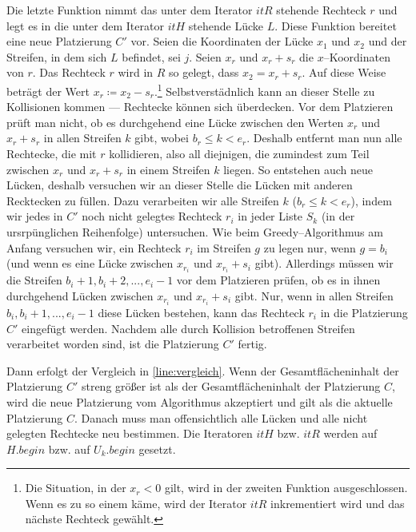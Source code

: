 Die letzte Funktion nimmt das unter dem Iterator $itR$ stehende Rechteck $r$
und legt es in die unter dem Iterator $itH$ stehende Lücke $L$.
Diese Funktion bereitet eine neue Platzierung $C'$ vor.
Seien die Koordinaten der Lücke $x_1$ und $x_2$ und der Streifen, in dem sich $L$ befindet, sei $j$. 
Seien $x_r$ und $x_r + s_r$ die $x$--Koordinaten von $r$.
Das Rechteck $r$ wird in $R$ so gelegt, dass $x_2 = x_r + s_r$. Auf diese Weise beträgt
der Wert $x_r \coloneqq x_2 - s_r$.\footnote{Die Situation, in der $x_r < 0$ gilt, wird  in der
zweiten Funktion ausgeschlossen. Wenn es zu so einem käme, wird der Iterator $itR$ inkrementiert wird und das nächste Rechteck gewählt.}
Selbstverstädnlich kann an dieser Stelle zu Kollisionen kommen --- Rechtecke können sich überdecken.
Vor dem Platzieren prüft man nicht, ob es durchgehend eine Lücke zwischen den Werten $x_r$ und $x_r + s_r$ 
in allen Streifen $k$ gibt, wobei $b_r \leqslant k < e_r$.
Deshalb entfernt man nun alle Rechtecke, die mit $r$ kollidieren, also all diejnigen, die 
zumindest zum Teil zwischen $x_r$ und $x_r + s_r$ in einem Streifen $k$ liegen.
So entstehen auch neue Lücken, deshalb versuchen wir an dieser Stelle 
die Lücken mit anderen Recktecken zu füllen.
Dazu verarbeiten wir alle Streifen $k$ ($b_r \leqslant k < e_r$), indem wir
jedes in $C'$ noch nicht gelegtes Rechteck $r_i$
in jeder Liste $S_k$ (in der ursrpünglichen Reihenfolge) untersuchen.
Wie beim Greedy--Algorithmus am Anfang versuchen wir, ein Rechteck
$r_i$ im Streifen $g$ zu legen nur, wenn $g = b_i$
(und wenn es eine Lücke zwischen $x_{r_i}$ und $x_{r_i} + s_i$ gibt).
Allerdings müssen wir die Streifen $b_i+1, b_i+2, ..., e_i-1$ vor dem Platzieren prüfen,
ob es in ihnen durchgehend Lücken zwischen $x_{r_i}$ und $x_{r_i} + s_i$ gibt. 
Nur, wenn in allen Streifen $b_i, b_i + 1, ..., e_i-1$ diese Lücken bestehen,
kann das Rechteck $r_i$ in die Platzierung $C'$ eingefügt werden. 
Nachdem alle durch Kollision betroffenen Streifen verarbeitet worden sind,
ist die Platzierung $C'$ fertig.

Dann erfolgt der Vergleich in \cref{line:vergleich}.
Wenn der Gesamtflächeninhalt der Platzierung $C'$ streng größer ist als
der Gesamtflächeninhalt der Platzierung $C$, wird die neue Platzierung vom Algorithmus
akzeptiert und gilt als die aktuelle Platzierung $C$.
Danach muss man offensichtlich alle Lücken und alle nicht gelegten Rechtecke neu bestimmen.
Die Iteratoren $itH$ bzw. $itR$ werden auf $H.begin$ bzw. auf $U_k.begin$ gesetzt. 

